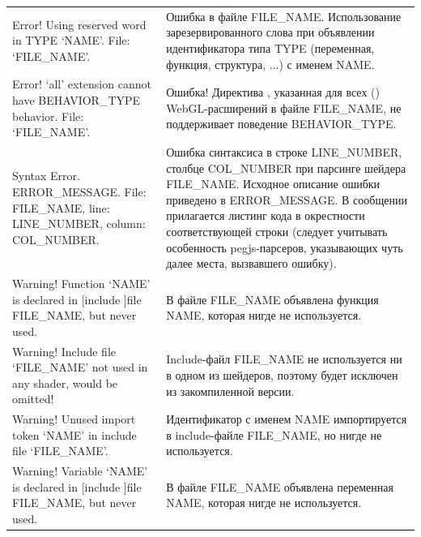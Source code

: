 \documentclass[a4paper,12pt,oneside]{sphinxmanual}
\begin{document}
\begin{tabulary}{\linewidth}{|L|L|}
\hline

Error! Using reserved word in TYPE
`NAME'. File: `FILE\_NAME'.
 & 
Ошибка в файле FILE\_NAME. Использование
зарезервированного слова при объявлении
идентификатора типа TYPE (переменная,
функция, структура, ...) с именем NAME.
\\

Error! `all' extension cannot have
BEHAVIOR\_TYPE behavior. File:
`FILE\_NAME'.
 & 
Ошибка! Директива ,
указанная для всех ()
WebGL-расширений в файле FILE\_NAME, не
поддерживает поведение BEHAVIOR\_TYPE.
\\

Syntax Error. ERROR\_MESSAGE. File:
FILE\_NAME, line: LINE\_NUMBER,
column: COL\_NUMBER.
 & 
Ошибка синтаксиса в строке LINE\_NUMBER,
столбце COL\_NUMBER при парсинге шейдера
FILE\_NAME. Исходное описание ошибки
приведено в ERROR\_MESSAGE. В сообщении
прилагается листинг кода в окрестности
соответствующей строки (следует
учитывать особенность pegjs-парсеров,
указывающих чуть далее места, вызвавшего
ошибку).
\\

Warning! Function `NAME' is
declared in {[}include {]}file
FILE\_NAME, but never used.
 & 
В файле FILE\_NAME объявлена функция NAME,
которая нигде не используется.
\\

Warning! Include file `FILE\_NAME'
not used in any shader, would be
omitted!
 & 
Include-файл FILE\_NAME не используется ни
в одном из шейдеров, поэтому будет
исключен из закомпиленной версии.
\\

Warning! Unused import token `NAME'
in include file `FILE\_NAME'.
 & 
Идентификатор с именем NAME импортируется
в include-файле FILE\_NAME, но нигде не
используется.
\\

Warning! Variable `NAME' is
declared in {[}include {]}file
FILE\_NAME, but never used.
 & 
В файле FILE\_NAME объявлена переменная
NAME, которая нигде не используется.
\\
\hline\end{tabulary}


\end{document}
